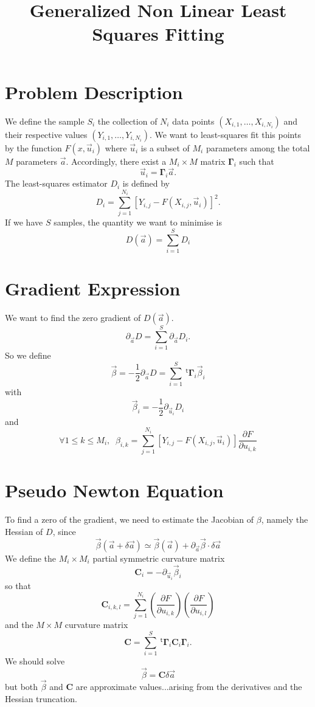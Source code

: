 \documentclass[aps,twocolumn]{revtex4}
\newcommand{\mymat}[1]{\boldsymbol{#1}}
\newcommand{\mytrn}[1]{~^{\mathsf{t}}#1}
\begin{document}
\title{Generalized Non Linear Least Squares Fitting}
\maketitle

\section{Problem Description}
We define the sample $S_i$ the collection of $N_i$ data points $(X_{i,1},\ldots,X_{i,N_i})$
and their respective values $(Y_{i,1},\ldots,Y_{i,N_i})$.
We want to least-squares fit this points by the function $F(x,\vec{u}_i)$
where $\vec{u}_i$ is a subset of $M_i$ parameters among the total $M$ parameters $\vec{a}$.
Accordingly, there exist a $M_i \times M$ matrix $\mymat{\Gamma}_i$ such that
$$
	\vec{u}_i = \mymat{\Gamma}_i \vec{a}.
$$
The least-squares estimator $D_i$ is defined by
$$
	D_i = \sum_{j=1}^{N_i} \left[Y_{i,j} - F\left(X_{i,j},\vec{u}_i\right) \right]^2.
$$
If we have $S$ samples,
the quantity we want to minimise is
$$
	D\left(\vec{a}\right) = \sum_{i=1}^S D_i
$$

\section{Gradient Expression}
We want to find the zero gradient of $D(\vec{a})$.
$$
	\partial_{\vec{a}} D = \sum_{i=1}^{S} \partial_{\vec{a}} D_i.
$$
So we define 
$$
	\vec{\beta} = -\dfrac{1}{2} \partial_{\vec{a}} D = \sum_{i=1}^{S} \mytrn{\mymat{\Gamma}}_i \vec{\beta}_i
$$
with
$$
	\vec{\beta}_{i} = -\dfrac{1}{2} \partial_{\vec{u}_i} D_i 
$$
and
$$
	\forall 1 \leq k \leq M_i, \;\; \beta_{i,k} =	 \sum_{j=1}^{N_i}\left[Y_{i,j} - F\left(X_{i,j},\vec{u}_i\right) \right]\dfrac{\partial F}{\partial u_{i,k}}
$$

\section{Pseudo Newton Equation}
To find a zero of the gradient, we need to estimate the Jacobian of $\beta$, namely the Hessian of $D$, since
$$
	 \vec\beta\left(\vec{a}+\delta\vec{a}\right) \simeq \vec\beta\left(\vec{a}\right) + \partial_{\vec{a}} \vec{\beta} \cdot \delta\vec{a}
$$
We define the $M_i \times M_i$ partial symmetric curvature  matrix 
$$
	\mymat{C}_i = -\partial_{\vec{u}_i} \vec{\beta}_i
$$
so that
$$
	\mymat{C}_{i,k,l} = \sum_{j=1}^{N_i} \left(\dfrac{\partial F}{\partial u_{i,k}}\right) \left(\dfrac{\partial F}{\partial u_{i,l}}\right)
$$
and the $M\times M$ curvature matrix
$$
	\mymat{C} = \sum_{i=1}^{S} \mytrn{\mymat{\Gamma}}_i \mymat{C}_i \mymat{\Gamma}_i.
$$
We should solve
$$
	\vec{\beta} = \mymat{C} \delta\vec{a}
$$
but both $\vec{\beta}$ and $\mymat{C}$ are approximate values...arising from the derivatives and the Hessian truncation.
\end{document}
